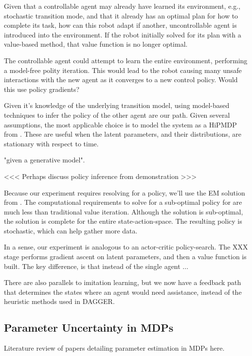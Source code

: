     Given that a controllable agent may already have learned its environment, e.g., stochastic transition mode, and that
    it already has an optimal plan for how to complete its task, how can this robot adapt if another, uncontrollable
    agent is introduced into the environment.  If the robot initially solved for its plan with a value-based method,
    that value function is no longer optimal.


    The controllable agent could attempt to learn the entire environment, performing a model-free polity iteration. This
    would lead to the robot causing many unsafe interactions with the new agent as it converges to a new control policy.
    Would this use policy gradients?

    Given it's knowledge of the underlying transition model, using model-based techniques to infer the policy of the other
    agent are our path. Given several assumptions, the most applicable choice is to model the system as a \ac{HiPMDP} from
    \cite{doshi2016hidden}. These are useful when the latent parameters, and their distributions, are stationary with
    respect to time.

    "given a generative model"\cite{doshi2016hidden}.

    \brk
    <<< Perhaps discuss policy inference from demonstration >>>
    \brk

    Because our experiment requires resolving for a policy, we'll use the \ac{EM} solution from
    \cite{toussaint2010expectation}. The computational requirements to solve for a sub-optimal policy for  are
    much less than traditional value iteration. Although the solution is sub-optimal, the solution is complete for the
    entire state-action-space. The resulting policy is stochastic, which can help gather more data.


    In a sense, our experiment is analogous to an actor-critic policy-search. The XXX stage performs gradient ascent on
    latent parameters, and then a value function is built. The key difference, is that instead of the single agent ...

    There are also parallels to imitation learning, but we now have a feedback path that determines the states where an
    agent would need assistance, instead of the heuristic methods used in DAGGER.


\subsection{Parameter Uncertainty in MDPs}
    Literature review of papers detailing parameter estimation in MDPs here.

